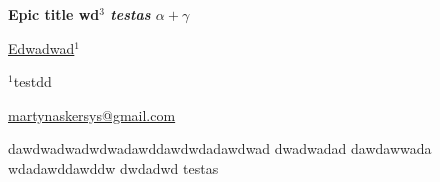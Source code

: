 \documentclass[12pt, twoside, a4paper, hidelinks]{article}
\begin{document}
        \begin{center}  \fontsize{14}{15}\selectfont \textbf{Epic title wd$^{3}$ \textit{testas} $\alpha + \gamma$} \end{center}
        \vspace{-0.8cm}\begin{center} \fontsize{12}{13}\selectfont \underline{Edwadwad}$^{1}$ \end{center}
        \vspace{-.5cm}

        \begin{center} \fontsize{10}{11}\selectfont $^{1}$testdd
            
            \underline{martynaskersys@gmail.com}
         \end{center}

        \fontsize{10}{11}\selectfont dawdwadwadwdwadawddawdwdadawdwad dwadwadad dawdawwada wdadawddawddw dwdadwd testas
        
\end{document}
